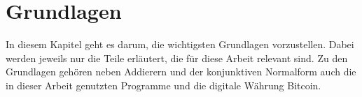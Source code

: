 \chapter{Grundlagen}
\label{chp:grundlagen}

In diesem Kapitel geht es darum, die wichtigsten Grundlagen vorzustellen.
Dabei werden jeweils nur die Teile erläutert, die für diese Arbeit relevant sind.
Zu den Grundlagen gehören neben Addierern und der konjunktiven Normalform auch
die in dieser Arbeit genutzten Programme und die digitale Währung Bitcoin.






